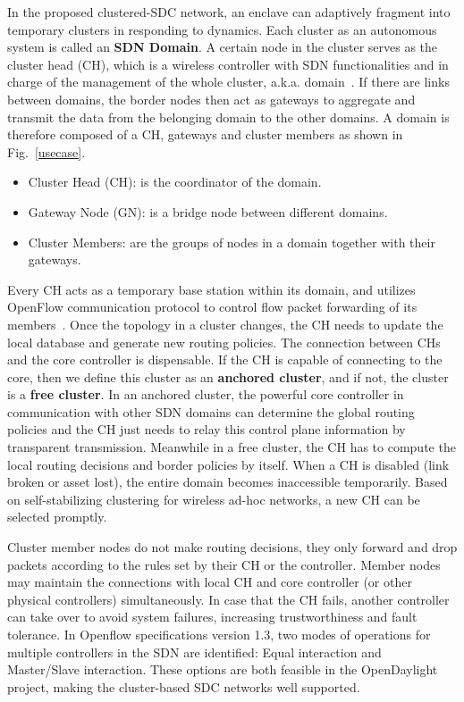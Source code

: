 \documentclass[conference]{IEEEtran}
\begin{document}
In the proposed clustered-SDC network, an enclave can adaptively fragment into temporary clusters in responding to dynamics. Each cluster as an autonomous system is called an \textbf{SDN Domain}. A certain node in the cluster serves as the cluster head (CH), which is a wireless controller with SDN functionalities and in charge of the management of the whole cluster, a.k.a. domain~\cite{olivier2015sdn}. If there are links between domains, the border nodes then act as gateways to aggregate and transmit the data from the belonging domain to the other domains. A domain is therefore composed of a CH, gateways and cluster members as shown in Fig.~\ref{usecase}.
\begin{itemize}
\item Cluster Head (CH): is the coordinator of the domain.
\item Gateway Node (GN): is a bridge node between different domains.
\item Cluster Members: are the groups of nodes in a domain together with their gateways.
\end{itemize}

Every CH acts as a temporary base station within its domain, and utilizes OpenFlow communication protocol to control flow packet forwarding of its members~\cite{dely2011openflow,luo2012sensor}. Once the topology in a cluster changes, the CH needs to update the local database and generate new routing policies. The connection between CHs and the core controller is dispensable. If the CH is capable of connecting to the core, then we define this cluster as an \textbf{anchored cluster}, and if not, the cluster is a \textbf{free cluster}. In an anchored cluster, the powerful core controller in communication with other SDN domains can determine the global routing policies and the CH just needs to relay this control plane information by transparent transmission. Meanwhile in a free cluster, the CH has to compute the local routing decisions and border policies by itself. When a CH is disabled (link broken or asset lost), the entire domain becomes inaccessible temporarily. Based on self-stabilizing clustering for wireless ad-hoc networks, a new CH can be selected promptly.

Cluster member nodes do not make routing decisions, they only forward and drop packets according to the rules set by their CH or the controller. Member nodes may maintain the connections with local CH and core controller (or other physical controllers) simultaneously. In case that the CH fails, another controller can take over to avoid system failures, increasing trustworthiness and fault tolerance. In Openflow specifications version 1.3, two modes of operations for multiple controllers in the SDN are identified: Equal interaction and Master/Slave interaction. These options are both feasible in the OpenDaylight project, making the cluster-based SDC networks well supported.
\end{document}
